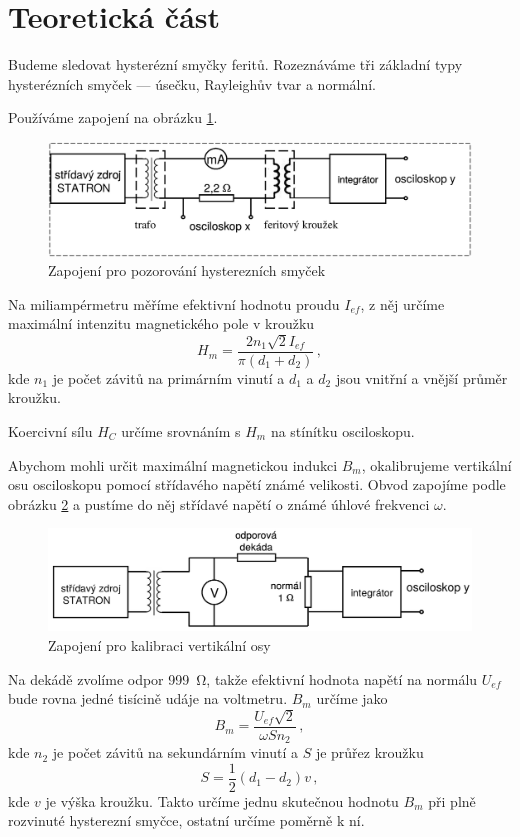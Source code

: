 \section*{Teoretická část}
Budeme sledovat hysterézní smyčky feritů.
Rozeznáváme tři základní typy hysterézních smyček --- úsečku, Rayleighův tvar a normální.

Používáme zapojení na obrázku \ref{o:schema}.

\begin{figure}[htbp]
\centering
\includegraphics[width=\textwidth-2cm]{graficos/schema}
\caption{Zapojení pro pozorování hysterezních smyček}
\label{o:schema}
\end{figure}

Na miliampérmetru měříme efektivní hodnotu proudu $I_{ef}$, z něj určíme maximální intenzitu magnetického pole v kroužku
\begin{equation}
H_m=\frac{2 n_1 \sqrt{2} I_{ef}}{\pi (d_1+d_2)} \,,
\end{equation}
kde $n_1$ je počet závitů na primárním vinutí a $d_1$ a $d_2$ jsou vnitřní a vnější průměr kroužku.

Koercivní sílu $H_C$ určíme srovnáním s $H_m$ na stínítku osciloskopu.

Abychom mohli určit maximální magnetickou indukci $B_m$, okalibrujeme vertikální osu osciloskopu pomocí střídavého napětí známé velikosti.
Obvod zapojíme podle obrázku \ref{o:kalib} a pustíme do něj střídavé napětí o známé úhlové frekvenci $\omega$.

\begin{figure}[htbp]
\centering
\includegraphics[width=\textwidth-2cm]{graficos/kalib}
\caption{Zapojení pro kalibraci vertikální osy}
\label{o:kalib}
\end{figure}

Na dekádě zvolíme odpor \SI{999}{\ohm}, takže efektivní hodnota napětí na normálu $U_{ef}$ bude rovna jedné tisícině udáje na voltmetru.
$B_m$ určíme jako \cite{skripta}
\begin{equation} \label{e:kalibrace}
B_m=\frac{U_{ef} \sqrt{2}}{\omega S n_2} \,,
\end{equation}
kde $n_2$ je počet závitů na sekundárním vinutí a $S$ je průřez kroužku
\begin{equation}
S=\frac{1}{2} (d_1-d_2) v \,,
\end{equation}
kde $v$ je výška kroužku.
Takto určíme jednu skutečnou hodnotu $B_m$ při plně rozvinuté hysterezní smyčce, ostatní určíme poměrně k ní.